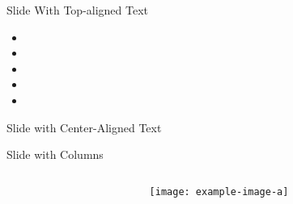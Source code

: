 
\begin{frame}[t]{Slide With Top-aligned Text}
    \lipsum[1][1-3]
    \begin{itemize}
      \item \lipsum[2][1]
      \item \lipsum[2][2]
      \item \lipsum[2][3]
      \item \lipsum[2][4]
      \item \lipsum[2][5]
    \end{itemize}
  \end{frame}
  
  \begin{frame}{Slide with Center-Aligned Text}
    \lipsum[2]
  \end{frame}
  
  \begin{frame}[t]{Slide with Columns}
  
    \begin{minipage}[t][\textheight][t]{\linewidth}
      \begin{columns}
        \begin{column}[T]{0.48\textwidth}
          \lipsum[3][1-10]
        \end{column}
        \hfill
        \begin{column}[T]{0.48\textwidth}
          \lipsum[4][1]
          \begin{center}
            \texttt{[image: example-image-a]}
          \end{center}
          \lipsum[4][2-5]
        \end{column}
      \end{columns}
    \end{minipage}
  
  \end{frame}